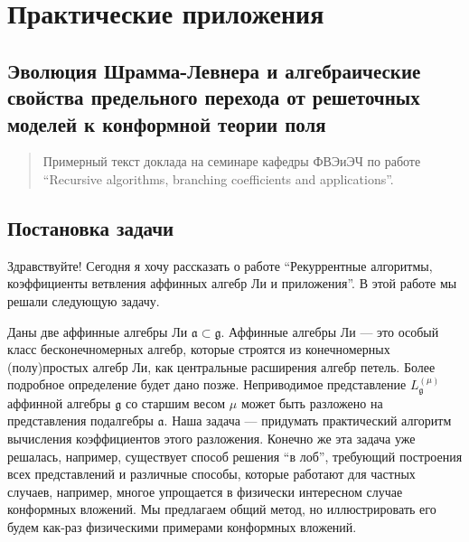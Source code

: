 \chapter{Практические приложения}
\label{cha:applications}

\section{Эволюция Шрамма-Левнера и алгебраические свойства предельного перехода от решеточных моделей к конформной теории поля}
\label{sec:SLE}
\newenvironment{comment}
{\par\noindent{\bf Для заинтересованных читателей}\\}
{\\\setlength{10cm}\\\hfill$\scriptstyle\blacksquare$\par}


\begin{abstract}
Примерный текст доклада на семинаре кафедры ФВЭиЭЧ по работе ``Recursive algorithms, branching coefficients and applications''.
\end{abstract}

\section{Постановка задачи}
\label{sec:task}

Здравствуйте!
Сегодня я хочу рассказать о работе ``Рекуррентные алгоритмы, коэффициенты ветвления аффинных алгебр
Ли и приложения''. В этой работе мы решали следующую задачу.

Даны две аффинные алгебры Ли $\mathfrak{a}\subset \mathfrak{g}$. Аффинные алгебры Ли --- это особый
класс бесконечномерных алгебр, которые строятся из конечномерных (полу)простых алгебр Ли, как
центральные расширения алгебр петель. Более подробное определение будет дано позже. Неприводимое
представление $L^{(\mu)}_{\mathfrak{g}}$ аффинной алгебры $\mathfrak{g}$ со старшим весом $\mu$
может быть разложено на представления подалгебры $\mathfrak{a}$. Наша задача --- придумать
практический алгоритм вычисления коэффициентов этого разложения. Конечно же эта задача уже решалась,
например, существует способ решения ``в лоб'', требующий построения всех представлений и различные способы,
которые работают для частных случаев, например, многое упрощается в физически интересном случае
конформных вложений. Мы предлагаем общий метод, но иллюстрировать его будем как-раз физическими
примерами конформных вложений.

